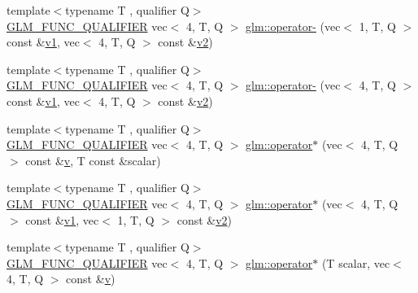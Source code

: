 \begin{DoxyCompactItemize}
\item 
{\footnotesize template$<$typename T , qualifier Q$>$ }\\\mbox{\hyperlink{setup_8hpp_a33fdea6f91c5f834105f7415e2a64407}{G\+L\+M\+\_\+\+F\+U\+N\+C\+\_\+\+Q\+U\+A\+L\+I\+F\+I\+ER}} vec$<$ 4, T, Q $>$ \mbox{\hyperlink{namespaceglm_aa6adf9242c7bf789bfb926bd98b0f8f5}{glm\+::operator-\/}} (vec$<$ 1, T, Q $>$ const \&\mbox{\hyperlink{_s_d_l__opengl__glext_8h_a435c176a02c061b43e19bdf7c86cceae}{v1}}, vec$<$ 4, T, Q $>$ const \&\mbox{\hyperlink{_s_d_l__opengl__glext_8h_a0928f6d0f0f794ba000a21dfae422136}{v2}})
\item 
{\footnotesize template$<$typename T , qualifier Q$>$ }\\\mbox{\hyperlink{setup_8hpp_a33fdea6f91c5f834105f7415e2a64407}{G\+L\+M\+\_\+\+F\+U\+N\+C\+\_\+\+Q\+U\+A\+L\+I\+F\+I\+ER}} vec$<$ 4, T, Q $>$ \mbox{\hyperlink{namespaceglm_aaf78fd105e4a74ef2fe1094a39b21e7f}{glm\+::operator-\/}} (vec$<$ 4, T, Q $>$ const \&\mbox{\hyperlink{_s_d_l__opengl__glext_8h_a435c176a02c061b43e19bdf7c86cceae}{v1}}, vec$<$ 4, T, Q $>$ const \&\mbox{\hyperlink{_s_d_l__opengl__glext_8h_a0928f6d0f0f794ba000a21dfae422136}{v2}})
\item 
{\footnotesize template$<$typename T , qualifier Q$>$ }\\\mbox{\hyperlink{setup_8hpp_a33fdea6f91c5f834105f7415e2a64407}{G\+L\+M\+\_\+\+F\+U\+N\+C\+\_\+\+Q\+U\+A\+L\+I\+F\+I\+ER}} vec$<$ 4, T, Q $>$ \mbox{\hyperlink{namespaceglm_abeb720ce21c2725cdd649305f09597d0}{glm\+::operator$\ast$}} (vec$<$ 4, T, Q $>$ const \&\mbox{\hyperlink{_s_d_l__opengl_8h_a10a82eabcb59d2fcd74acee063775f90}{v}}, T const \&scalar)
\item 
{\footnotesize template$<$typename T , qualifier Q$>$ }\\\mbox{\hyperlink{setup_8hpp_a33fdea6f91c5f834105f7415e2a64407}{G\+L\+M\+\_\+\+F\+U\+N\+C\+\_\+\+Q\+U\+A\+L\+I\+F\+I\+ER}} vec$<$ 4, T, Q $>$ \mbox{\hyperlink{namespaceglm_a997737ae7452a2fb472ae72f53a7bec4}{glm\+::operator$\ast$}} (vec$<$ 4, T, Q $>$ const \&\mbox{\hyperlink{_s_d_l__opengl__glext_8h_a435c176a02c061b43e19bdf7c86cceae}{v1}}, vec$<$ 1, T, Q $>$ const \&\mbox{\hyperlink{_s_d_l__opengl__glext_8h_a0928f6d0f0f794ba000a21dfae422136}{v2}})
\item 
{\footnotesize template$<$typename T , qualifier Q$>$ }\\\mbox{\hyperlink{setup_8hpp_a33fdea6f91c5f834105f7415e2a64407}{G\+L\+M\+\_\+\+F\+U\+N\+C\+\_\+\+Q\+U\+A\+L\+I\+F\+I\+ER}} vec$<$ 4, T, Q $>$ \mbox{\hyperlink{namespaceglm_ac0fbdb71d09e9f93421c8c159851fec6}{glm\+::operator$\ast$}} (T scalar, vec$<$ 4, T, Q $>$ const \&\mbox{\hyperlink{_s_d_l__opengl_8h_a10a82eabcb59d2fcd74acee063775f90}{v}})

\end{DoxyCompactItemize}

